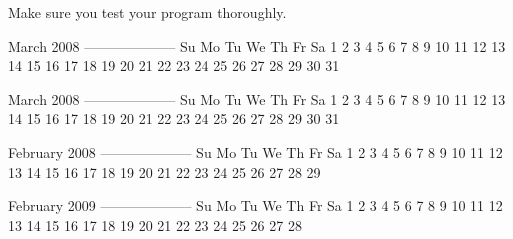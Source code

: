 Make sure you test your program thoroughly.


\resett
\nextt
\begin{console}[frame=single, commandchars=\\\{\}]
March 2008
--------------------
Su Mo Tu We Th Fr Sa  
                   1
 2  3  4  5  6  7  8
 9 10 11 12 13 14 15 
16 17 18 19 20 21 22
23 24 25 26 27 28 29
30 31
\end{console}

\nextt
\begin{console}[frame=single, commandchars=\\\{\}]
March 2008
--------------------
Su Mo Tu We Th Fr Sa  
             1  2  3
 4  5  6  7  8  9 10
11 12 13 14 15 16 17 
18 19 20 21 22 23 24 
25 26 27 28 29 30 31
\end{console}

\nextt
\begin{console}[frame=single, commandchars=\\\{\}]
February 2008
--------------------
Su Mo Tu We Th Fr Sa  
                1  2
 3  4  5  6  7  8  9
10 11 12 13 14 15 16 
17 18 19 20 21 22 23 
24 25 26 27 28 29
\end{console}

\nextt
\begin{console}[frame=single, commandchars=\\\{\}]
February 2009
--------------------
Su Mo Tu We Th Fr Sa  
 1  2  3  4  5  6  7  
 8  9 10 11 12 13 14 
15 16 17 18 19 20 21 
22 23 24 25 26 27 28
\end{console}
